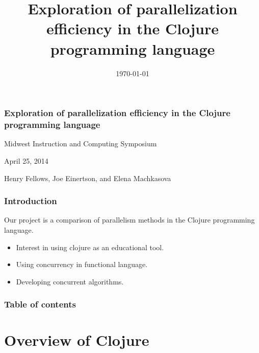 \documentclass{beamer}
\begin{document}
\title{Exploration of parallelization efficiency in the Clojure programming language}
\date{\today}

\begin{frame}
\frametitle{Exploration of parallelization efficiency in the Clojure programming language}
{\centering
Midwest Instruction and Computing Symposium\par
April 25, 2014\par
Henry Fellows, Joe Einertson, and Elena Machkasova\par
}
\end{frame}


\begin{frame}[fragile]
\frametitle{Introduction}
	Our project is a comparison of parallelism methods in the Clojure programming language.
	\begin{itemize}
	\item Interest in using clojure as an educational tool.
	\item Using concurrency in functional language.
	\item Developing concurrent algorithms.
	\end{itemize}
\end{frame}

\begin{frame}
\frametitle{Table of contents}
\tableofcontents %
\end{frame}

\section{Overview of Clojure}
\end{document}
